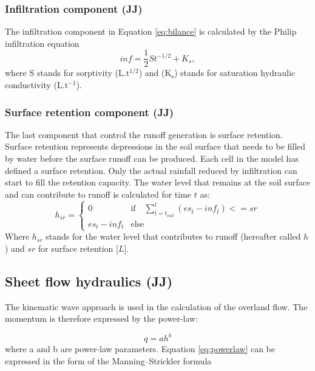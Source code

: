         \subsubsection{Infiltration component (JJ) }
            The infiltration component in Equation \ref{eq:bilance} is
            calculated by the Philip infiltration equation \citep{philip1957}
            \begin{equation} 
            inf = \frac{1}{2}St^{-1/2}+K_s,
            \label{eq:infiltration}
            \end{equation}
            where S stands for sorptivity ($\mathrm{L.t^{1/2}}$) and ($\mathrm{K_s}$)
            stands for saturation hydraulic conductivity ($\mathrm{L.t^{-1}}$).

        \subsubsection{Surface retention component (JJ)}
            The last component that control the runoff generation is surface retention. 
            Surface retention represents depressions in the soil surface that needs to 
            be filled by water before the surface runoff can be produced. 
            Each cell in the model has defined a surface retention. Only the
            actual rainfall reduced by infiltration can start to fill the
            retention capacity. The water level that remains at the soil
            surface and can contribute to runoff is calculated for time $t$ as:
            $$
            h_{sr}= 
            \begin{cases}
                0             & \text{if}\quad \sum_{\bar{t} = t_{init}}^{t} (es_{\bar{t}} - inf_{\bar{t}}) <= sr\\
                es_t - inf_t  & \text{else}
            \end{cases}
            $$
            Where $h_{sr}$ stands for  the water level that contributes to
            runoff (hereafter called $h$) and $sr$ for surface retention [$L$].

    \subsection{Sheet flow hydraulics (JJ)}
        The kinematic wave approach is used in the calculation of the overland flow.
        The momentum is therefore expressed by the power-law:

        \begin{equation} 
        q = ah^b
        \label{eq:powerlaw}
        \end{equation}
        where a and b are power-law parameters. Equation \ref{eq:powerlaw} can be
        expressed in the form of the Manning–Strickler formula


